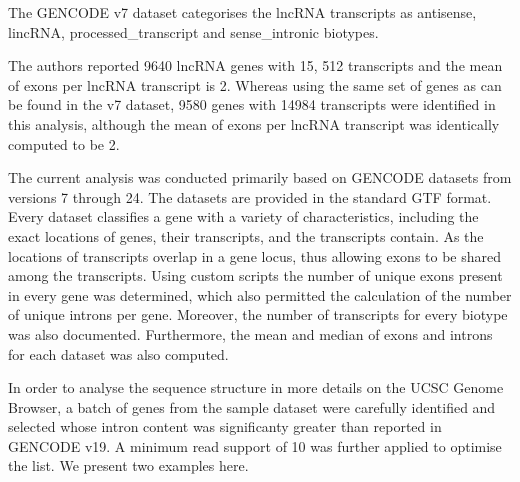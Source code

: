 \documentclass[ncrna,article,submit,moreauthors,pdftex,10pt,a4paper]{mdpi}
\begin{document}
The GENCODE v7 dataset categorises the lncRNA transcripts as antisense, lincRNA, processed\_transcript and sense\_intronic biotypes. 

The authors reported 9640 lncRNA genes with 15, 512 transcripts and the mean of exons per lncRNA transcript is 2.
Whereas using the same set of genes as can be found in the v7 dataset, 9580 genes with 14984 transcripts were identified in this analysis, although 
the mean of exons per lncRNA transcript was identically computed to be 2.

The current analysis was conducted primarily based on GENCODE datasets from versions 7 through 24. 
The datasets are provided in the standard GTF format. Every dataset classifies a gene with a variety of characteristics, including
the exact locations of genes, their transcripts, and the transcripts contain. As the locations of transcripts overlap in a
gene locus, thus allowing exons to be shared among the transcripts.
Using custom scripts the number of unique exons present in every gene was determined, which also permitted the calculation
of the number of unique introns per gene. Moreover, the number of transcripts for every biotype was also documented.
Furthermore, the mean and median of exons and introns for each dataset was also computed.

In order to analyse the sequence structure in more details on the UCSC Genome Browser, a batch of genes from the sample dataset 
were carefully identified and selected whose intron content was significanty greater than reported in GENCODE v19. A minimum read support of 10
was further applied to optimise the list.
We present two examples here. 
\end{document}
